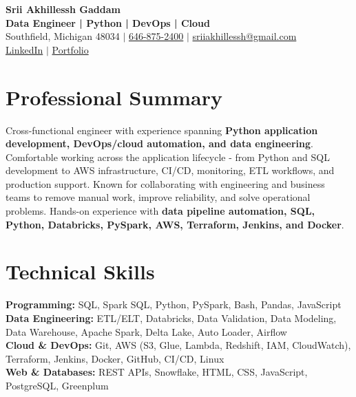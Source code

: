 \documentclass[letterpaper,10pt]{article}
\begin{document}
\fontsize{9.35pt}{10.45pt}\selectfont

\begin{center}
    {\LARGE \textbf{Srii Akhillessh Gaddam}} \\[-1pt]
    \textbf{Data Engineer | Python | DevOps | Cloud} \\[2pt]
    Southfield, Michigan 48034 $|$
    \href{tel:6468752400}{646-875-2400} $|$
    \href{mailto:sriiakhillessh@gmail.com}{sriiakhillessh@gmail.com} \\[1pt]
    \href{https://www.linkedin.com/in/srii-akhiilessh-gaddam-b48668191/}{LinkedIn} $|$
    \href{https://sriiakhillesshg.github.io/portfolio/}{Portfolio}
\end{center}
\vspace{-8pt}

\section{Professional Summary}
\small{Cross-functional engineer with experience spanning \textbf{Python application development, DevOps/cloud automation, and data engineering}. Comfortable working across the application lifecycle - from Python and SQL development to AWS infrastructure, CI/CD, monitoring, ETL workflows, and production support. Known for collaborating with engineering and business teams to remove manual work, improve reliability, and solve operational problems. Hands-on experience with \textbf{data pipeline automation, SQL, Python, Databricks, PySpark, AWS, Terraform, Jenkins, and Docker}.}

\section{Technical Skills}
\small{
\textbf{Programming:} SQL, Spark SQL, Python, PySpark, Bash, Pandas, JavaScript \\
\textbf{Data Engineering:} ETL/ELT, Databricks, Data Validation, Data Modeling, Data Warehouse, Apache Spark, Delta Lake, Auto Loader, Airflow \\
\textbf{Cloud \& DevOps:} Git, AWS (S3, Glue, Lambda, Redshift, IAM, CloudWatch), Terraform, Jenkins, Docker, GitHub, CI/CD, Linux \\
\textbf{Web \& Databases:} REST APIs, Snowflake, HTML, CSS, JavaScript, PostgreSQL, Greenplum
}
\end{document}
